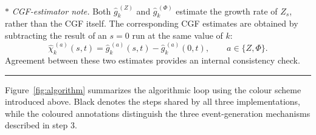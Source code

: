 \documentclass[11pt]{article}
\begin{document}
\medskip
\noindent$\boldsymbol{*}$\textit{ CGF-estimator note.}
Both $\widehat{g}^{\,(Z)}_k$ and $\widehat{g}^{\,(\Phi)}_k$ estimate the growth rate of $Z_s$, rather than the CGF itself. The corresponding CGF estimates are obtained by subtracting the result of an $s=0$ run at the same value of $k$:
\[
    \widehat{\chi}^{\,(a)}_k(s,t)
    =\widehat{g}^{\,(a)}_k(s,t)
    -\widehat{g}^{\,(a)}_k(0,t),
    \qquad a\in\{Z,\Phi\}.
\]
Agreement between these two estimates provides an internal consistency check.

\smallskip
\noindent\rule{\linewidth}{0.6pt}
\medskip

Figure~\ref{fig:algorithm} summarizes the algorithmic loop using the colour scheme introduced above. Black denotes the steps shared by all three implementations, while the coloured annotations distinguish the three event-generation mechanisms described in step 3.
\end{document}
